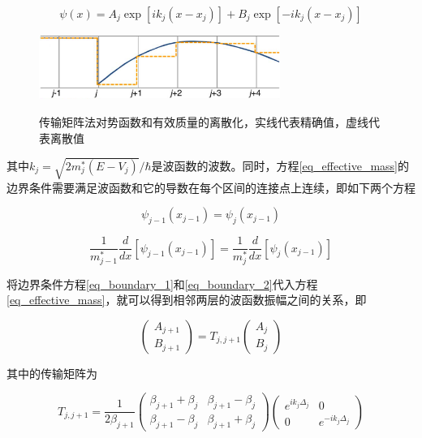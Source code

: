 \documentclass{ZJUthesis}
\begin{document}
\begin{equation}
    \label{eq_effective_mass_solution}
    \psi(x) = A_j \exp [i k_j (x-x_j)] + B_j \exp [-i k_j (x-x_j)]
\end{equation}

\begin{figure}[!htb]
  \centering
  \includegraphics[width=0.7\textwidth]{./Pictures/tmm.eps}\\
  \caption{传输矩阵法对势函数和有效质量的离散化，实线代表精确值，虚线代表离散值}
  \label{fig_tmm}
\end{figure}

其中$k_j=\sqrt{2 m^*_j (E-V_j)} / \hbar$是波函数的波数。同时，方程\ref{eq_effective_mass}的边界条件需要满足波函数和它的导数在每个区间的连接点上连续，即如下两个方程

\begin{equation}
    \label{eq_boundary_1}
    \psi_{j-1}(x_{j-1}) = \psi_j(x_{j-1}) 
\end{equation}

\begin{equation}
    \label{eq_boundary_2}
    \frac{1}{m^*_{j-1}} \frac{d}{dx} [ \psi_{j-1}(x_{j-1}) ] = \frac{1}{m^*_j} \frac{d}{dx} [\psi_j(x_{j-1})]
\end{equation}

将边界条件方程\ref{eq_boundary_1}和\ref{eq_boundary_2}代入方程\ref{eq_effective_mass}，就可以得到相邻两层的波函数振幅之间的关系，即

\begin{equation}
    \label{eq_tmm}
    \begin{pmatrix} A_{j+1} \\ B_{j+1} \end{pmatrix} = T_{j,j+1} \begin{pmatrix} A_{j} \\ B_{j} \end{pmatrix}
\end{equation}

其中的传输矩阵为

\begin{equation}
    \label{eq_transfer_matrix}
    T_{j,j+1} = \frac{1}{2\beta_{j+1}} \begin{pmatrix} \beta_{j+1}+\beta_j & \beta_{j+1}-\beta_j  \\ \beta_{j+1}-\beta_j  & \beta_{j+1}+\beta_j  \end{pmatrix} \begin{pmatrix} e^{ik_j\Delta_j} & 0 \\ 0 & e^{-ik_j\Delta_j} \end{pmatrix}
\end{equation}
\end{document}
